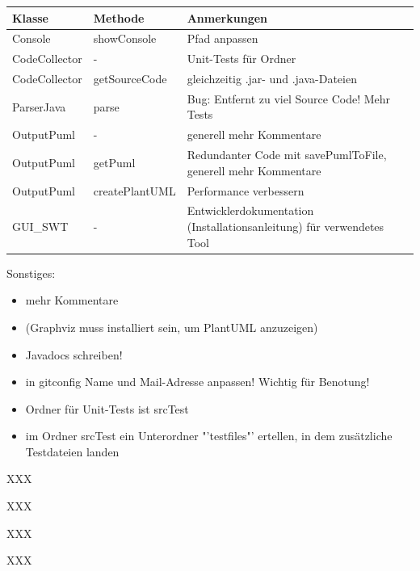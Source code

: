 \begin{table}[H]

\begin{tabularx}{\textwidth}{ |l|l|X| }
\hline
\textbf{Klasse} & \textbf{Methode} & \textbf{Anmerkungen}\\
 \hline
Console & showConsole & Pfad anpassen \\
CodeCollector & - & Unit-Tests für Ordner \\
CodeCollector & getSourceCode & gleichzeitig .jar- und .java-Dateien \\
ParserJava & parse & Bug: Entfernt zu viel Source Code! Mehr Tests\\
OutputPuml & - & generell mehr Kommentare \\
OutputPuml & getPuml & Redundanter Code mit savePumlToFile, generell mehr Kommentare\\
OutputPuml & createPlantUML & Performance verbessern \\
GUI\_SWT & - & Entwicklerdokumentation (Installationsanleitung) für verwendetes Tool\\
\hline
\end{tabularx}
\end{table}

Sonstiges:
\begin{itemize}
\item mehr Kommentare
\item (Graphviz muss installiert sein, um PlantUML anzuzeigen)
\item Javadocs schreiben!
\item in gitconfig Name und Mail-Adresse anpassen! Wichtig für Benotung!
\item Ordner für Unit-Tests ist srcTest
\item im Ordner srcTest ein Unterordner "'testfiles"' ertellen, in dem zusätzliche Testdateien landen
\end{itemize}
\nsecend

XXX
\nsecend

XXX
\nsecend

XXX
\nsecend

XXX
\nsecend

